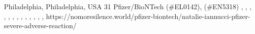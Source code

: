           {
            Philadelphia, Philadelphia, USA
          }
          {
            31
          }
          {
            Pfizer/BioNTech
          }
          {
             (\#EL0142), 
             (\#EN5318)
          }
          {
            ,
            ,
            ,
            ,
            ,
            ,
            ,
            ,
            ,
            ,
            ,
            ,
            ,
          }
          {
            https://nomoresilence.world/pfizer-biontech/natalie-iannucci-pfizer-severe-adverse-reaction/
          }


